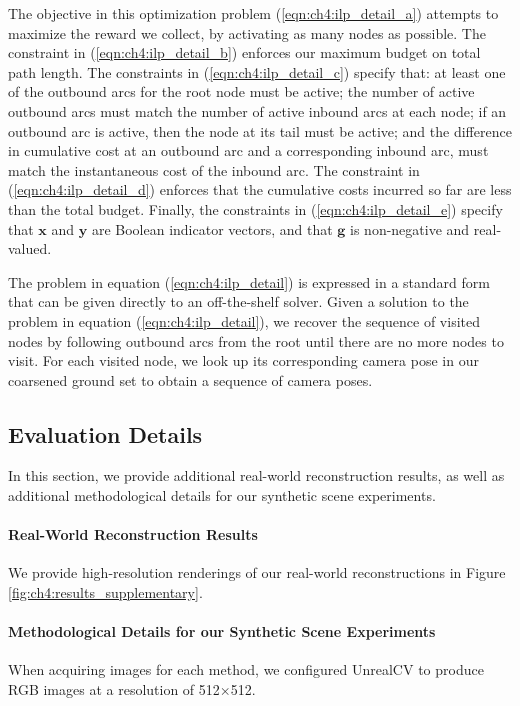 The objective in this optimization problem (\ref{eqn:ch4:ilp_detail_a}) attempts to maximize the reward we collect, by activating as many nodes as possible.
The constraint in (\ref{eqn:ch4:ilp_detail_b}) enforces our maximum budget on total path length.
The constraints in (\ref{eqn:ch4:ilp_detail_c}) specify that: at least one of the outbound arcs for the root node must be active; the number of active outbound arcs must match the number of active inbound arcs at each node; if an outbound arc is active, then the node at its tail must be active; and the difference in cumulative cost at an outbound arc and a corresponding inbound arc, must match the instantaneous cost of the inbound arc.
The constraint in (\ref{eqn:ch4:ilp_detail_d}) enforces that the cumulative costs incurred so far are less than the total budget.
Finally, the constraints in (\ref{eqn:ch4:ilp_detail_e}) specify that $\mathbf{x}$ and $\mathbf{y}$ are Boolean indicator vectors, and that $\mathbf{g}$ is non-negative and real-valued.

The problem in equation (\ref{eqn:ch4:ilp_detail}) is expressed in a standard form that can be given directly to an off-the-shelf solver.
Given a solution to the problem in equation (\ref{eqn:ch4:ilp_detail}), we recover the sequence of visited nodes by following outbound arcs from the root until there are no more nodes to visit.
For each visited node, we look up its corresponding camera pose in our coarsened ground set to obtain a sequence of camera poses.

\subsection{Evaluation Details}
\label{sec:ch4:eval_detail}

In this section, we provide additional real-world reconstruction results, as well as additional methodological details for our synthetic scene experiments.

\paragraph{Real-World Reconstruction Results}
We provide high-resolution renderings of our real-world reconstructions in Figure \ref{fig:ch4:results_supplementary}.

\paragraph{Methodological Details for our Synthetic Scene Experiments}
When acquiring images for each method, we configured UnrealCV \cite{qiu:2016} to produce RGB images at a resolution of 512$\times$512.

